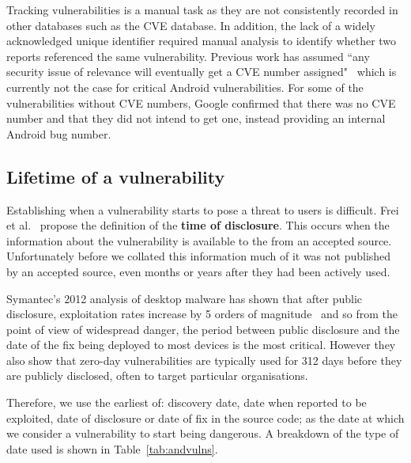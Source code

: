 \documentclass{llncs}
\begin{document}
Tracking vulnerabilities is a manual task as they are not consistently recorded in other databases such as the CVE database.
In addition, the lack of a widely acknowledged unique identifier required manual analysis to identify whether two reports referenced the same vulnerability.
Previous work has assumed ``any security issue of relevance will eventually get a CVE number assigned"~\cite{Frei2010} which is currently not the case for critical Android vulnerabilities.
For some of the vulnerabilities without CVE numbers, Google confirmed that there was no CVE number and that they did not intend to get one, instead providing an internal Android bug number.


\subsection{Lifetime of a vulnerability}

Establishing when a vulnerability starts to pose a threat to users is difficult.
Frei et al.~\cite{Frei2010} propose the definition of the \textbf{time of disclosure}.
This occurs when the information about the vulnerability is available to the from an accepted source.
Unfortunately before we collated this information much of it was not published by an accepted source, even months or years after they had been actively used.

Symantec's 2012 analysis of desktop malware has shown that after public disclosure, exploitation rates increase by 5 orders of magnitude~\cite{Bilge2012} and so from the point of view of widespread danger, the period between public disclosure and the date of the fix being deployed to most devices is the most critical.
However they also show that zero-day vulnerabilities are typically used for 312 days before they are publicly disclosed, often to target particular organisations.

Therefore, we use the earliest of: discovery date, date when reported to be exploited, date of disclosure or date of fix in the source code; as the date at which we consider a vulnerability to start being dangerous.
A breakdown of the type of date used is shown in Table~\ref{tab:andvulns}.
\end{document}
